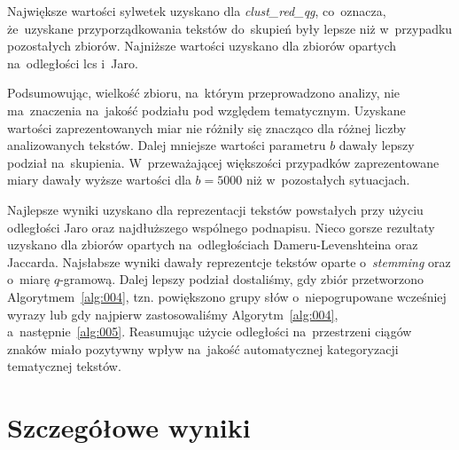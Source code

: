 \documentclass{praca1}
\begin{document}
Największe wartości sylwetek uzyskano dla \emph{clust\_red\_qg}, co~oznacza, że~uzyskane przyporządkowania tekstów do~skupień były lepsze niż w~przypadku pozostałych zbiorów. Najniższe wartości uzyskano dla zbiorów opartych na~odległości lcs i~Jaro.


Podsumowując, wielkość zbioru, na~którym przeprowadzono analizy, nie ma~znaczenia na~jakość podziału pod względem tematycznym. Uzyskane wartości zaprezentowanych miar nie różniły się znacząco dla różnej liczby analizowanych tekstów. Dalej mniejsze wartości parametru $b$ dawały lepszy podział na~skupienia. W~przeważającej większości przypadków zaprezentowane miary dawały wyższe wartości dla $b=5000$ niż w~pozostałych sytuacjach.

Najlepsze wyniki uzyskano dla reprezentacji tekstów powstałych przy użyciu odległości Jaro oraz najdłuższego wspólnego podnapisu. Nieco gorsze rezultaty uzyskano dla zbiorów opartych na~odległościach Dameru-Levenshteina oraz Jaccarda. Najsłabsze wyniki dawały reprezentcje tekstów oparte o~\emph{stemming} oraz o~miarę $q$-gramową. Dalej lepszy podział dostaliśmy, gdy zbiór przetworzono Algorytmem~\ref{alg:004}, tzn. powiększono grupy słów o~niepogrupowane wcześniej wyrazy lub gdy najpierw zastosowaliśmy Algorytm~\ref{alg:004}, a~następnie~\ref{alg:005}. Reasumując użycie odległości na~przestrzeni ciągów znaków miało pozytywny wpływ na~jakość automatycznej kategoryzacji tematycznej tekstów.

\section{Szczegółowe wyniki}
\end{document}

